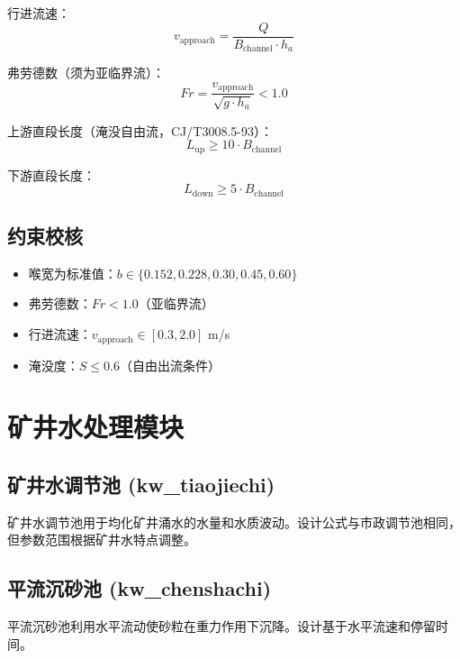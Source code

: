 \documentclass[12pt,a4paper]{ctexart}
\begin{document}
行进流速：
\begin{equation}
v_{\text{approach}} = \frac{Q}{B_{\text{channel}} \cdot h_a}
\end{equation}

弗劳德数（须为亚临界流）：
\begin{equation}
Fr = \frac{v_{\text{approach}}}{\sqrt{g \cdot h_a}} < 1.0
\end{equation}

上游直段长度（淹没自由流，CJ/T3008.5-93）：
\begin{equation}
L_{\text{up}} \ge 10 \cdot B_{\text{channel}}
\end{equation}

下游直段长度：
\begin{equation}
L_{\text{down}} \ge 5 \cdot B_{\text{channel}}
\end{equation}

\subsection{约束校核}
\begin{itemize}
  \item 喉宽为标准值：$b \in \{0.152, 0.228, 0.30, 0.45, 0.60\}$
  \item 弗劳德数：$Fr < 1.0$（亚临界流）
  \item 行进流速：$v_{\text{approach}} \in [0.3, 2.0]$ m/s
  \item 淹没度：$S \le 0.6$（自由出流条件）
\end{itemize}

\section{矿井水处理模块}

\subsection{矿井水调节池 (kw\_tiaojiechi)}
矿井水调节池用于均化矿井涌水的水量和水质波动。设计公式与市政调节池相同，但参数范围根据矿井水特点调整。

\subsection{平流沉砂池 (kw\_chenshachi)}
平流沉砂池利用水平流动使砂粒在重力作用下沉降。设计基于水平流速和停留时间。
\end{document}
